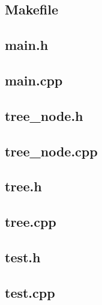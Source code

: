 \documentclass[12pt]{article}
\begin{document}
\subsection{Makefile}


\subsection{main.h}


\subsection{main.cpp}


\subsection{tree\_node.h}


\subsection{tree\_node.cpp}


\subsection{tree.h}


\subsection{tree.cpp}


\subsection{test.h}


\subsection{test.cpp}

\end{document}
